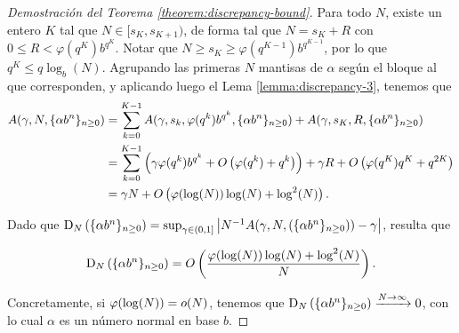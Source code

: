 \begin{proof}[Demostración del Teorema \ref{theorem:discrepancy-bound}]

Para todo $N$, existe un entero $K$ tal que $N \in [s_K, s_{K+1})$, de forma
tal que $N = s_K + R$ con $0 \leq R < \varphi(q^K)b^{q^K}$.
Notar que $N \geq s_K \geq \varphi(q^{K-1})b^{q^{K-1}}$, por lo que
$q^K \leq q \log_b(N)$.
Agrupando las primeras
$N$ mantisas de $\alpha$ según el bloque al que corresponden,
y aplicando luego el Lema \ref{lemma:discrepancy-3}, tenemos que
\begin{align*}
A(\gamma, N, \lbrace \alpha b^n \rbrace_{n \geq 0})
	&= \sum_{k=0}^{K - 1} A(\gamma, s_k, \varphi(q^k)b^{q^k},
		\lbrace \alpha b^n \rbrace_{n \geq 0})
		+ A(\gamma, s_K, R, \lbrace \alpha b^n \rbrace_{n \geq 0}) \\
	&= \sum_{k=0}^{K - 1} \left( \gamma \varphi(q^k)b^{q^k} +
		O \left( \varphi(q^k) + q^{k} \right) \right)
		+ \gamma R + O \left(\varphi(q^K)q^{K} + q^{2K} \right) \\
	&= \gamma N + O \left(\varphi(\log(N))\log(N) + \log^2(N) \right).
\end{align*}

Dado que $\operatorname{D}_{N}\left(\lbrace \alpha b^n \rbrace_{n \geq 0}\right)
= \sup_{\gamma \in (0,1]} \left\vert N^{-1} A(\gamma, N,
\left(\lbrace \alpha b^n \rbrace_{n \geq 0}\right)) - \gamma \right\vert$, resulta que

\[ \operatorname{D}_{N}\left(\lbrace \alpha b^n \rbrace_{n \geq 0}\right) =
	O \left(\frac{\varphi(\log(N)) \log(N) + \log^2(N)}{N} \right). \]

Concretamente, si $\varphi(\log(N)) = o(N)$, tenemos que
$\operatorname{D}_{N}\left(\lbrace \alpha b^n \rbrace_{n \geq 0}\right)
\xrightarrow{N \to \infty} 0$, con lo cual $\alpha$ es un número normal
en base $b$.
\end{proof}
